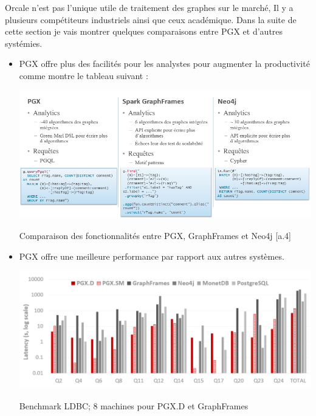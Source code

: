 Orcale n’est pas l’unique utile de traitement des graphes sur le marché, Il y a plusieurs compétiteurs industriels ainsi que ceux académique. Dans la suite de cette section je vais montrer quelques comparaisons entre PGX et d’autres systémies.\\
\begin{itemize}
\item PGX offre plus des facilités pour les analystes pour augmenter la productivité comme montre le tableau suivant :
\begin{table}[H]  
  \centering
    \includegraphics[width=1.15\textwidth]{chapitre1/Figures/FonctionalitesPGX.png}
  \caption{Comparaison des fonctionnalités entre PGX, GraphFrames et Neo4j [a.4]}
\end{table}

\item PGX offre une meilleure performance par rapport aux autres systèmes.

\begin{table}[H]  
  \centering
    \includegraphics[width=1.15\textwidth]{chapitre1/Figures/BenchmarkLDBC.png}
  \caption{Benchmark LDBC; 8 machines pour PGX.D et GraphFrames}
\end{table}
\end{itemize}

